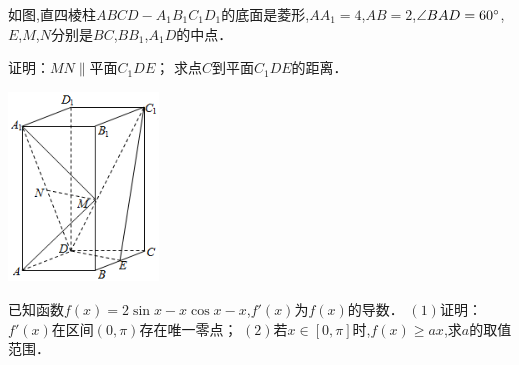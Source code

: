 \documentclass[windows,list]{BHCexam}
\begin{document}
\begin{groups}
\begin{questions}[t]
\begin{minipage}{\linewidth}
\begin{solution}{6cm}
\end{solution}
\end{minipage}
\vfill
\begin{minipage}{\linewidth}
\question[12] 如图,直四棱柱$ABCD-A _{1} B _{1} C _{1} D _{1}$的底面是菱形,$AA _{1} =4$,$AB=2$,$ \angle BAD=60^{\small \circ}$,$E$,$M$,$N$分别是$BC$,$BB _{1}$,$A _{1} D$的中点．
\begin{subquestions}
    \subquestion 证明：$MN \parallel $平面$C _{1} DE$；
    \subquestion 求点$C$到平面$C _{1} DE$的距离．
\end{subquestions}
\begin{center}
\includegraphics[width=4cm]{./rOqrX8AOkhQtAGTSvgdyU0mzeH3pIfTp.png}
\vspace{0.5cm}
\end{center}
\begin{solution}{6cm}

\end{solution}
\end{minipage}
\vfill
\begin{minipage}{\linewidth}
\question[12] 已知函数$f(x)=2\sin x-x\cos x-x$,$f ' (x)$为$f(x)$的导数．  $(1)$证明：$f ' (x)$在区间$(0 ,  \pi )$存在唯一零点； $(2)$若$x \in [0 ,  \pi ]$时,$f(x)\geqslant ax$,求$a$的取值范围．
\begin{solution}{6cm}


\end{solution}
\end{minipage}
\end{questions}
\end{groups}
\end{document}
